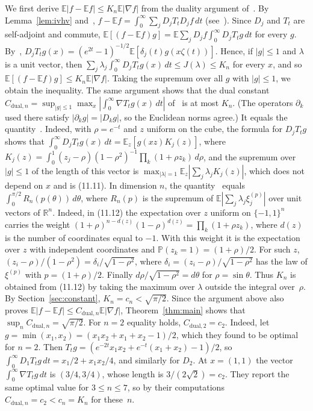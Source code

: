 \documentclass[11pt]{amsart}
\theoremstyle{remark}
\numberwithin{equation}{section}
\newcommand{\R}{\mathbb{R}}
\newcommand{\E}{\mathbb{E}}
\renewcommand{\P}{\mathbb{P}}
\begin{document}
We first derive $\E|f-\E f|\le K_n\E|\nabla f|$ from the duality argument of~\cite[Section~2]{ILvHV}. By Lemma~\ref{lem:ivhv} and~\cite[Lemma~2.1]{IvHV}, $f-\E f=\int_0^\infty\sum_jD_jT_tD_jf\,dt$ (see~\cite[Remark~2.2]{IvHV}). Since $D_j$ and $T_t$ are self-adjoint and commute, $\E[(f-\E f)g]=\E\sum_jD_jf\int_0^\infty D_jT_tg\,dt$ for every $g$. By~\cite[Lemma~2.1]{IvHV}, $D_jT_tg(x)=(e^{2t}-1)^{-1/2}\E[\delta_j(t)g(x\zeta(t))]$. Hence, if $|g|\le1$ and $\lambda$ is a unit vector, then $\sum_j\lambda_j\int_0^\infty D_jT_tg(x)\,dt\le J(\lambda)\le K_n$ for every $x$, and so $\E[(f-\E f)g]\le K_n\E|\nabla f|$. Taking the supremum over all $g$ with $|g|\le1$, we obtain the inequality. The same argument shows that the dual constant $C_{\mathrm{dual},n}=\sup_{|g|\le1}\max_x|\int_0^\infty\nabla T_tg(x)\,dt|$ of~\cite[(12.1)]{ILvHV} is at most $K_n$. (The operators $\partial_k$ used there satisfy $|\partial_kg|=|D_kg|$, so the Euclidean norms agree.) It equals the quantity~\cite[(11.11)]{ILvHV}. Indeed, with $\rho=e^{-t}$ and $z$ uniform on the cube, the formula for $D_jT_tg$ shows that $\int_0^\infty D_jT_tg(x)\,dt=\E_z[g(xz)K_j(z)]$, where $K_j(z)=\int_0^1(z_j-\rho)(1-\rho^2)^{-1}\prod_k(1+\rho z_k)\,d\rho$, and the supremum over $|g|\le1$ of the length of this vector is $\max_{|\lambda|=1}\E_z|\sum_j\lambda_jK_j(z)|$, which does not depend on $x$ and is (11.11). In dimension $n$, the quantity~\cite[(11.12)]{ILvHV} equals $\int_0^{\pi/2}R_n(p(\theta))\,d\theta$, where $R_n(p)$ is the supremum of $\E|\sum_j\lambda_j\xi_j^{(p)}|$ over unit vectors of $\R^n$. Indeed, in (11.12) the expectation over $z$ uniform on $\{-1,1\}^n$ carries the weight $(1+\rho)^{n-d(z)}(1-\rho)^{d(z)}=\prod_k(1+\rho z_k)$, where $d(z)$ is the number of coordinates equal to $-1$. With this weight it is the expectation over $z$ with independent coordinates and $\P(z_k=1)=(1+\rho)/2$. For such $z$, $(z_i-\rho)/(1-\rho^2)=\delta_i/\sqrt{1-\rho^2}$, where $\delta_i=(z_i-\rho)/\sqrt{1-\rho^2}$ has the law of $\xi^{(p)}$ with $p=(1+\rho)/2$. Finally $d\rho/\sqrt{1-\rho^2}=d\theta$ for $\rho=\sin\theta$. Thus $K_n$ is obtained from (11.12) by taking the maximum over $\lambda$ outside the integral over~$\rho$. By Section~\ref{sec:constant}, $K_n=c_n<\sqrt{\pi/2}$. Since the argument above also proves $\E|f-\E f|\le C_{\mathrm{dual},n}\E|\nabla f|$, Theorem~\ref{thm:main} shows that $\sup_nC_{\mathrm{dual},n}=\sqrt{\pi/2}$. For $n=2$ equality holds, $C_{\mathrm{dual},2}=c_2$. Indeed, let $g=\min(x_1,x_2)=(x_1x_2+x_1+x_2-1)/2$, which they found to be optimal for $n=2$. Then $T_tg=(e^{-2t}x_1x_2+e^{-t}(x_1+x_2)-1)/2$, so $\int_0^\infty D_1T_tg\,dt=x_1/2+x_1x_2/4$, and similarly for $D_2$. At $x=(1,1)$ the vector $\int_0^\infty\nabla T_tg\,dt$ is $(3/4,3/4)$, whose length is $3/(2\sqrt2)=c_2$. They report the same optimal value for $3\le n\le7$, so by their computations $C_{\mathrm{dual},n}=c_2<c_n=K_n$ for these~$n$.
\end{document}
